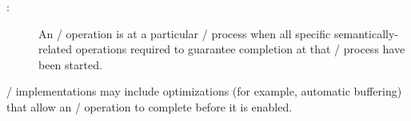 \begin{description}
\item[:]
    An \MPI/ operation is  at a particular \MPI/ process when all specific semantically-related operations
    required to guarantee completion at that \MPI/ process have been started.
\end{description}

\begin{rationale}
\MPI/ implementations may include optimizations (for example, automatic buffering) that allow
an \MPI/ operation to complete before it is enabled.
\end{rationale}

